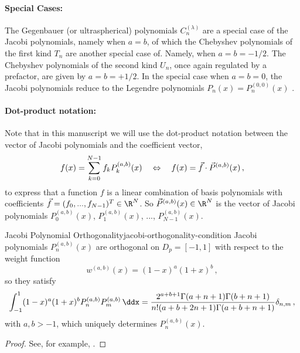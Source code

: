 \paragraph{Special Cases:}
The Gegenbauer (or ultraspherical) polynomials $C_n^{(\lambda)}$ are a special case of the Jacobi polynomials, namely when $a = b$,
of which the Chebyshev polynomials of the first kind $T_n$ are another special case of.
Namely, when $a = b = -1/2$.
The Chebyshev polynomials of the second kind $U_n$, once again regulated by a prefactor, are given by $a = b = +1/2$.
In the special case when $a = b = 0$, the Jacobi polynomials reduce to the Legendre polynomials $P_n(x) = P_n^{(0, 0)}(x)$ \cite{2018-nist}.


\paragraph{Dot-product notation:}
Note that in this manuscript we will use the dot-product notation between the vector of Jacobi polynomials and the coefficient vector,
$$f(x) = \sum_{k=0}^{N-1} f_k P_k^{(a, b)}(x) \quad\Leftrightarrow\quad f(x) = \vec{f} \cdot \vec{P}^{(a, b)}(x)\,,$$
to express that a function $f$ is a linear combination of basis polynomials with coefficients $\vec{f} = (f_0, ..., f_{N-1})^T \in \R^N$.
So $\vec{P}^{(a, b)}(x) \in \R^N$ is the vector of Jacobi polynomials $P^{(a, b)}_0(x)$, $P^{(a, b)}_1(x)$, ..., $P^{(a, b)}_{N-1}(x)$.

\begin{theorem}{Jacobi Polynomial Orthogonality}{jacobi-orthogonality-condition}
  Jacobi polynomials $P_n^{(a,b)}(x)$ are orthogonal on $D_p = [-1,1]$ with respect to the weight function
  \begin{equation*}
    w^{(a,b)}(x)=(1-x)^a (1+x)^b\,,
  \end{equation*}
  so they satisfy
  \begin{align*}
    \int_{-1}^1(1-x)^a(1+x)^bP_n^{(a,b)}P_m^{(a,b)}\,\ddx = \frac{2^{a+b+1} \Gamma (a+n+1) \Gamma (b+n+1)}{n! (a+b+2 n+1) \Gamma (a+b+n+1)} \delta_{n,m}\,,
  \end{align*}
  with $a	,b>-1$, which uniquely determines $P_n^{(a,b)}(x)$.
\end{theorem}
\begin{proof}
  See, for example, \cite{1995-jacobi-orthogonality-proof}.
\end{proof}

